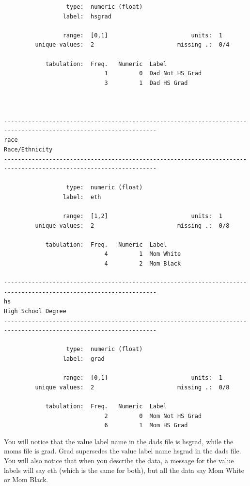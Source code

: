 \documentclass[
]{book}
\begin{document}
\begin{verbatim}
                  type:  numeric (float)
                 label:  hsgrad

                 range:  [0,1]                        units:  1
         unique values:  2                        missing .:  0/4

            tabulation:  Freq.   Numeric  Label
                             1         0  Dad Not HS Grad
                             3         1  Dad HS Grad



------------------------------------------------------------------------------------------------------------------
race                                                                                                Race/Ethnicity
------------------------------------------------------------------------------------------------------------------

                  type:  numeric (float)
                 label:  eth

                 range:  [1,2]                        units:  1
         unique values:  2                        missing .:  0/8

            tabulation:  Freq.   Numeric  Label
                             4         1  Mom White
                             4         2  Mom Black

------------------------------------------------------------------------------------------------------------------
hs                                                                                              High School Degree
------------------------------------------------------------------------------------------------------------------

                  type:  numeric (float)
                 label:  grad

                 range:  [0,1]                        units:  1
         unique values:  2                        missing .:  0/8

            tabulation:  Freq.   Numeric  Label
                             2         0  Mom Not HS Grad
                             6         1  Mom HS Grad
\end{verbatim}

You will notice that the value label name in the dads file is hsgrad, while the moms file is grad. Grad supersedes the value label name hsgrad in the dads file. You will also notice that when you describe the data, a message for the value labels will say eth (which is the same for both), but
all the data say Mom White or Mom Black.
\end{document}
